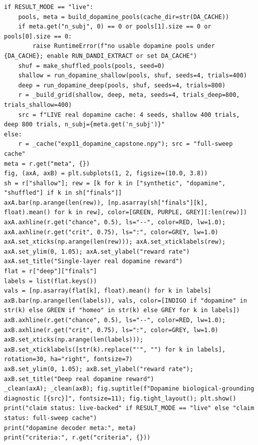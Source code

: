 \begin{lstlisting}[caption={05\_biological\_grounding.ipynb code cell 4},label={lst:mrl-nb-05-biological-grounding-4}]
if RESULT_MODE == "live":
    pools, meta = build_dopamine_pools(cache_dir=str(DA_CACHE))
    if meta.get("n_subj", 0) == 0 or pools[1].size == 0 or pools[0].size == 0:
        raise RuntimeError(f"no usable dopamine pools under {DA_CACHE}; enable RUN_DANDI_EXTRACT or set DA_CACHE")
    shuf = make_shuffled_pools(pools, seed=0)
    shallow = run_dopamine_shallow(pools, shuf, seeds=4, trials=400)
    deep = run_dopamine_deep(pools, shuf, seeds=4, trials=800)
    r = _build_grid(shallow, deep, meta, seeds=4, trials_deep=800, trials_shallow=400)
    src = f"LIVE real dopamine cache: 4 seeds, shallow 400 trials, deep 800 trials, n_subj={meta.get('n_subj')}"
else:
    r = _cache("exp11_dopamine_capstone.npy"); src = "full-sweep cache"
meta = r.get("meta", {})
fig, (axA, axB) = plt.subplots(1, 2, figsize=(10.0, 3.8))
sh = r["shallow"]; rew = [k for k in ["synthetic", "dopamine", "shuffled"] if k in sh["finals"]]
axA.bar(np.arange(len(rew)), [np.asarray(sh["finals"][k], float).mean() for k in rew], color=[GREEN, PURPLE, GREY][:len(rew)])
axA.axhline(r.get("chance", 0.5), ls="--", color=RED, lw=1.0); axA.axhline(r.get("crit", 0.75), ls=":", color=GREY, lw=1.0)
axA.set_xticks(np.arange(len(rew))); axA.set_xticklabels(rew); axA.set_ylim(0, 1.05); axA.set_ylabel("reward rate")
axA.set_title("Single-layer real dopamine reward")
flat = r["deep"]["finals"]
labels = list(flat.keys())
vals = [np.asarray(flat[k], float).mean() for k in labels]
axB.bar(np.arange(len(labels)), vals, color=[INDIGO if "dopamine" in str(k) else GREEN if "homeo" in str(k) else GREY for k in labels])
axB.axhline(r.get("chance", 0.5), ls="--", color=RED, lw=1.0); axB.axhline(r.get("crit", 0.75), ls=":", color=GREY, lw=1.0)
axB.set_xticks(np.arange(len(labels))); axB.set_xticklabels([str(k).replace("'", "") for k in labels], rotation=30, ha="right", fontsize=7)
axB.set_ylim(0, 1.05); axB.set_ylabel("reward rate"); axB.set_title("Deep real dopamine reward")
_clean(axA); _clean(axB); fig.suptitle(f"Dopamine biological-grounding diagnostic [{src}]", fontsize=11); fig.tight_layout(); plt.show()
print("claim status: live-backed" if RESULT_MODE == "live" else "claim status: full-sweep cache")
print("dopamine decoder meta:", meta)
print("criteria:", r.get("criteria", {}))
\end{lstlisting}

